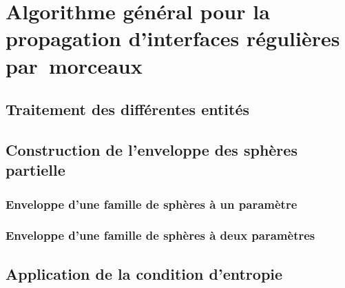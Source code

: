 \chapter[Algorithme de propagation d'interfaces régulières par~morceaux]{Algorithme général pour la propagation d'interfaces régulières par~morceaux}
\label{chap:algo_general}



\section{Traitement des différentes entités \brep}


\section{Construction de l'enveloppe des sphères partielle}
\subsection{Enveloppe d'une famille de sphères à un paramètre}
\subsection{Enveloppe d'une famille de sphères à deux paramètres}

\section{Application de la condition d'entropie}%
